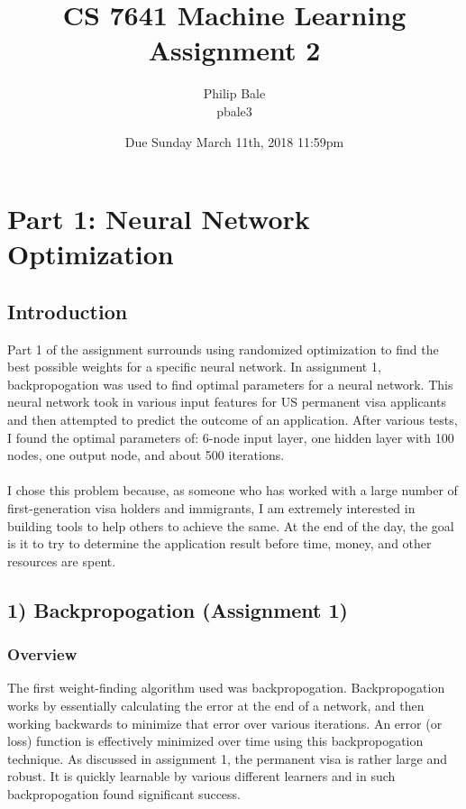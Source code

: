 \documentclass[h]{article}
\title{CS 7641 Machine Learning \\ Assignment 2}
\date{Due Sunday March 11th, 2018 11:59pm}
\author{Philip Bale \\ pbale3}
\begin{document}
\maketitle

\section*{Part 1: Neural Network Optimization}
\subsection*{ Introduction}  
Part 1 of the assignment surrounds using randomized optimization to find the 
best possible weights for a specific neural network.  In assignment 1, backpropogation 
was used to find optimal parameters for a neural network.  This neural network 
took in various input features for US permanent visa applicants and then 
attempted to predict the outcome of an application.  After various tests, I found the optimal parameters of: 6-node input layer, one hidden layer with 100 nodes, 
one output node, and about 500 iterations.
\\ \\ I chose this problem because, as someone who has worked 
with a large number of first-generation visa holders and immigrants, I am 
extremely interested in building tools to help others to achieve the same.  At the end of the day, the goal is it to try to determine the application result 
before time, money, and other resources are spent.

\subsection*{1) Backpropogation (Assignment 1)}  
\subsubsection*{Overview}
The first weight-finding algorithm used was backpropogation.  Backpropogation works by essentially calculating 
the error at the end of a network, and then working backwards to minimize that error over various iterations. 
 An error (or loss) function is effectively minimized over time using this backpropogation technique.   As discussed in assignment 1, the permanent 
 visa is rather large and robust.  It is quickly learnable by various different 
 learners and in such backpropogation found significant success.
 
\end{document}
